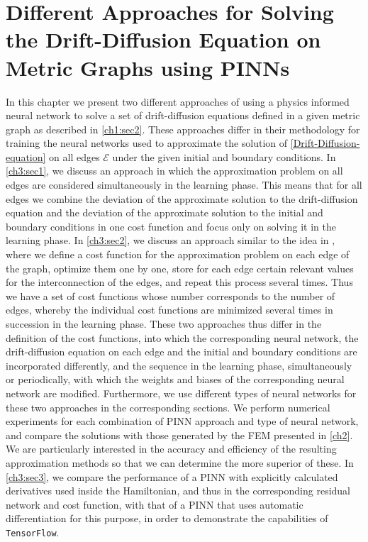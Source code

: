 \chapter{Different Approaches for Solving the Drift-Diffusion Equation on Metric Graphs using PINNs}

In this chapter we present two different approaches of using a physics informed neural network to solve a set of drift-diffusion equations defined in a given metric graph as described in \cref{ch1:sec2}. These approaches differ in their methodology for training the neural networks used to approximate the solution of \cref{Drift-Diffusion-equation} on all edges $\mathcal{E}$ under the given initial and boundary conditions. In \cref{ch3:sec1}, we discuss an approach in which the approximation problem on all edges are considered simultaneously in the learning phase. This means that for all edges we combine the deviation of the approximate solution to the drift-diffusion equation and the deviation of the approximate solution to the initial and boundary conditions in one cost function and focus only on solving it in the learning phase. In \cref{ch3:sec2}, we discuss an approach similar to the idea in \cite{JagtapKharazmiKarniadakis:2020}, where we define a cost function for the approximation problem on each edge of the graph, optimize them one by one, store for each edge certain relevant values for the interconnection of the edges, and repeat this process several times. Thus we have a set of cost functions whose number corresponds to the number of edges, whereby the individual cost functions are minimized several times in succession in the learning phase. These two approaches thus differ in the definition of the cost functions, into which the corresponding neural network, the drift-diffusion equation on each edge and the initial and boundary conditions are incorporated differently, and the sequence in the learning phase, simultaneously or periodically, with which the weights and biases of the corresponding neural network are modified. Furthermore, we use different types of neural networks for these two approaches in the corresponding sections. We perform numerical experiments for each combination of PINN approach and type of neural network, and compare the solutions with those generated by the FEM presented in \cref{ch2}. We are particularly interested in the accuracy and efficiency of the resulting approximation methods so that we can determine the more superior of these. In \cref{ch3:sec3}, we compare the performance of a PINN with explicitly calculated derivatives used inside the Hamiltonian, and thus in the corresponding residual network and cost function, with that of a PINN that uses automatic differentiation for this purpose, in order to demonstrate the capabilities of \lstinline!TensorFlow!. \\

